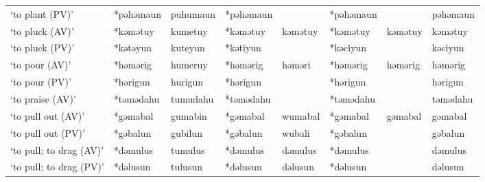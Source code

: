 \begin{landscape}
\begin{longtable}[c]{@{}p{3cm}<{\raggedright}p{2.75cm}<{\raggedright}p{2.75cm}<{\raggedright}p{2.75cm}<{\raggedright}p{2.75cm}<{\raggedright}p{2.75cm}<{\raggedright}p{2.75cm}<{\raggedright}p{2.75cm}<{\raggedright}@{}}
`to plant (PV)'                                      & *pəhəmaun          & puhumaun                       & *pəhəmaun          &                            & *pəhəmaun        &                          & pəhəmaun                          \\
`to pluck (AV)'                                      & *kəmətuy           & kumetuy                        & *kəmətuy           & kəmətuy                    & *kəmətuy         & kəmətuy                  & kəmətuy                           \\
`to pluck (PV)'                                      & *kətəyun           & kuteyun                        & *kətiyun           &                            & *kəciyun         &                          & kəciyun                           \\
`to pour (AV)'                                       & *həmərig           & humeruy                        & *həmərig           & həməri                     & *həmərig         & həmərig                  & həmərig                           \\
`to pour (PV)'                                       & *hərigun           & hurigun                        & *hərigun           &                            & *hərigun         &                          & hərigun                           \\
`to praise (AV)'                                     & *təmədahu          & tumudahu                       & *təmədahu          &                            & *təmədahu        &                          & təmədahu                          \\
`to pull out (AV)'                                   & *gəmabal           & gumabin                        & *gəmabal           & wumabal                    & *gəmabal         & gəmabal                  & gəmabal                           \\
`to pull out (PV)'                                   & *gəbalun           & gubilun                        & *gəbalun           & wubali                     & *gəbalun         &                          & gəbalun                           \\
`to pull; to drag (AV)'                              & *dəmulus           & tumulus                        & *dəmulus           & dəmulus                    & *dəmulus         &                          & dəmulus                           \\
`to pull; to drag (PV)'                              & *dəlusun           & tulusun                        & *dəlusun           & dəlusun                    & *dəlusun         &                          & dəlusun                           \\

\end{longtable}
\end{landscape}
